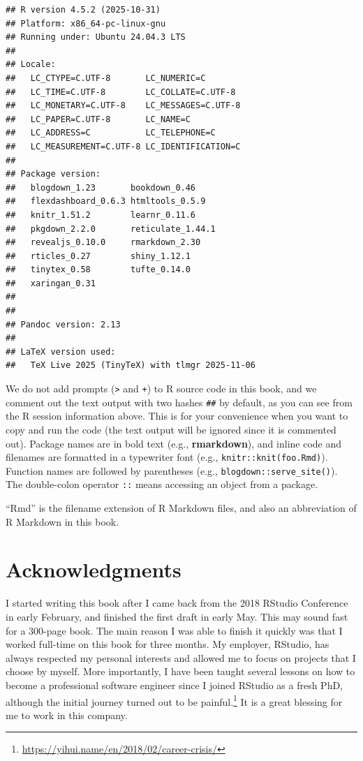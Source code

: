 \documentclass[
  11pt,
]{krantz}
\renewcommand{\href}[2]{#2\footnote{\url{#1}}}
\theoremstyle{definition}
\theoremstyle{definition}
\theoremstyle{definition}
\theoremstyle{definition}
\theoremstyle{remark}
\begin{document}
\begin{verbatim}
## R version 4.5.2 (2025-10-31)
## Platform: x86_64-pc-linux-gnu
## Running under: Ubuntu 24.04.3 LTS
## 
## Locale:
##   LC_CTYPE=C.UTF-8       LC_NUMERIC=C          
##   LC_TIME=C.UTF-8        LC_COLLATE=C.UTF-8    
##   LC_MONETARY=C.UTF-8    LC_MESSAGES=C.UTF-8   
##   LC_PAPER=C.UTF-8       LC_NAME=C             
##   LC_ADDRESS=C           LC_TELEPHONE=C        
##   LC_MEASUREMENT=C.UTF-8 LC_IDENTIFICATION=C   
## 
## Package version:
##   blogdown_1.23       bookdown_0.46      
##   flexdashboard_0.6.3 htmltools_0.5.9    
##   knitr_1.51.2        learnr_0.11.6      
##   pkgdown_2.2.0       reticulate_1.44.1  
##   revealjs_0.10.0     rmarkdown_2.30     
##   rticles_0.27        shiny_1.12.1       
##   tinytex_0.58        tufte_0.14.0       
##   xaringan_0.31      
## 
## 
## Pandoc version: 2.13
## 
## LaTeX version used: 
##   TeX Live 2025 (TinyTeX) with tlmgr 2025-11-06
\end{verbatim}

We do not add prompts (\texttt{\textgreater{}} and \texttt{+}) to R source code in this book, and we comment out the text output with two hashes \texttt{\#\#} by default, as you can see from the R session information above. This is for your convenience when you want to copy and run the code (the text output will be ignored since it is commented out). Package names are in bold text (e.g., \textbf{rmarkdown}), and inline code and filenames are formatted in a typewriter font (e.g., \texttt{knitr::knit(\textquotesingle{}foo.Rmd\textquotesingle{})}). Function names are followed by parentheses (e.g., \texttt{blogdown::serve\_site()}). The double-colon operator \texttt{::} means accessing an object from a package.

``Rmd'' is the filename extension of R Markdown files, and also an abbreviation of R Markdown in this book.

\hypertarget{acknowledgments}{%
\section*{Acknowledgments}\label{acknowledgments}}


I started writing this book after I came back from the 2018 RStudio Conference in early February, and finished the first draft in early May. This may sound fast for a 300-page book. The main reason I was able to finish it quickly was that I worked full-time on this book for three months. My employer, RStudio, has always respected my personal interests and allowed me to focus on projects that I choose by myself. More importantly, I have been taught several lessons on how to become a professional software engineer since I joined RStudio as a fresh PhD, although \href{https://yihui.name/en/2018/02/career-crisis/}{the initial journey turned out to be painful.} It is a great blessing for me to work in this company.
\end{document}
